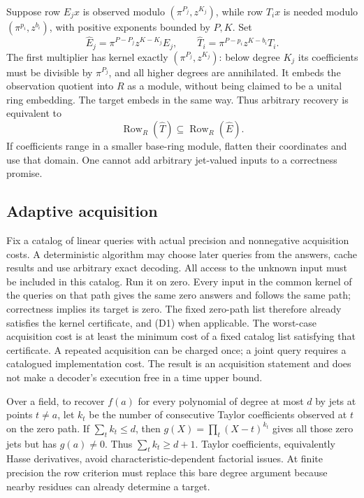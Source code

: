 \documentclass[
  11pt,
]{article}
\begin{document}
Suppose row \(E_jx\) is observed modulo \((\pi^{P_j},z^{K_j})\), while
row \(T_ix\) is needed modulo \((\pi^{p_i},z^{b_i})\), with positive
exponents bounded by \(P,K\). Set \[
 \widehat E_j=\pi^{P-P_j}z^{K-K_j}E_j,\qquad
 \widehat T_i=\pi^{P-p_i}z^{K-b_i}T_i.
\] The first multiplier has kernel exactly \((\pi^{P_j},z^{K_j})\):
below degree \(K_j\) its coefficients must be divisible by
\(\pi^{P_j}\), and all higher degrees are annihilated. It embeds the
observation quotient into \(R\) as a module, without being claimed to be
a unital ring embedding. The target embeds in the same way. Thus
arbitrary recovery is equivalent to \[
 \operatorname{Row}_R(\widehat T)
       \subseteq\operatorname{Row}_R(\widehat E). \tag{D1}
\] If coefficients range in a smaller base-ring module, flatten their
coordinates and use that domain. One cannot add arbitrary jet-valued
inputs to a correctness promise.

\subsection{Adaptive acquisition}\label{v8-adaptive-acquisition}

Fix a catalog of linear queries with actual precision and nonnegative
acquisition costs. A deterministic algorithm may choose later queries
from the answers, cache results and use arbitrary exact decoding. All
access to the unknown input must be included in this catalog. Run it on
zero. Every input in the common kernel of the queries on that path gives
the same zero answers and follows the same path; correctness implies its
target is zero. The fixed zero-path list therefore already satisfies the
kernel certificate, and (D1) when applicable. The worst-case acquisition
cost is at least the minimum cost of a fixed catalog list satisfying
that certificate. A repeated acquisition can be charged once; a joint
query requires a catalogued implementation cost. The result is an
acquisition statement and does not make a decoder's execution free in a
time upper bound.

Over a field, to recover \(f(a)\) for every polynomial of degree at most
\(d\) by jets at points \(t\ne a\), let \(k_t\) be the number of
consecutive Taylor coefficients observed at \(t\) on the zero path. If
\(\sum_t k_t\le d\), then \(g(X)=\prod_t(X-t)^{k_t}\) gives all those
zero jets but has \(g(a)\ne0\). Thus \(\sum_t k_t\ge d+1\). Taylor
coefficients, equivalently Hasse derivatives, avoid
characteristic-dependent factorial issues. At finite precision the row
criterion must replace this bare degree argument because nearby residues
can already determine a target.
\end{document}
